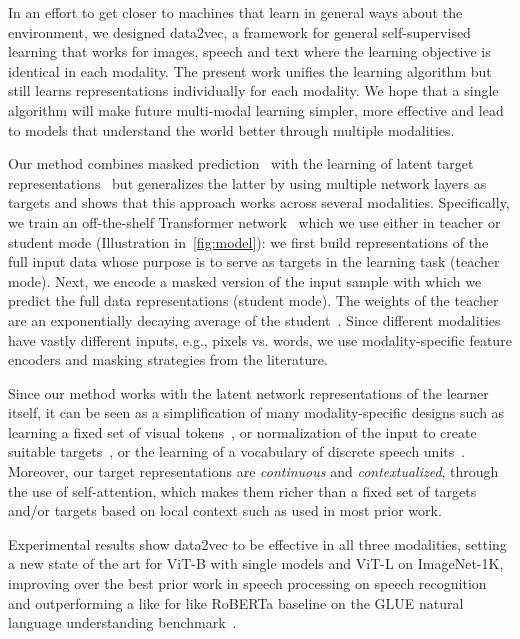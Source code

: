\documentclass[nohyperref]{article}
\theoremstyle{plain}
\theoremstyle{definition}
\theoremstyle{remark}
\newcommand{\name}{data2vec}
\begin{document}
In an effort to get closer to machines that learn in general ways about the environment, we designed \name{}, a framework for general self-supervised learning that works for images, speech and text where the learning objective is identical in each modality.
The present work unifies the learning algorithm but still learns representations individually for each modality.
We hope that a single algorithm will make future multi-modal learning simpler, more effective and lead to models that understand the world better through multiple modalities.

Our method combines masked prediction~\citep{devlin2018bert,baevski2020wav,bao2021beit} with the learning of latent target representations~\citep{grill2020byol,caron2021dino} but generalizes the latter by using multiple network layers as targets and shows that this approach works across several modalities.
Specifically, we train an off-the-shelf Transformer network~\citep{vaswani2017transformer} which we use either in teacher or student mode (Illustration in~\autoref{fig:model}):
we first build representations of the full input data whose purpose is to serve as targets in the learning task (teacher mode).
Next, we encode a masked version of the input sample with which we predict the full data representations (student mode).
The weights of the teacher are an exponentially decaying average of the student~\citep{he2019momentum,grill2020byol,caron2021dino}.
Since different modalities have vastly different inputs, e.g., pixels vs. words, we use modality-specific feature encoders and masking strategies from the literature.

Since our method works with the latent network representations of the learner itself, it can be seen as a simplification of many modality-specific designs such as learning a fixed set of visual tokens~\citep{radford2021clip,oord2017vqvae}, or normalization of the input to create suitable targets~\citep{he2021mae}, or the learning of a vocabulary of discrete speech units~\citep{baevski2020wav,hsu2020hubert}. 
Moreover, our target representations are \emph{continuous} and \emph{contextualized}, through the use of self-attention, which makes them richer than a fixed set of targets and/or targets based on local context such as used in most prior work.

Experimental results show \name{} to be effective in all three modalities, setting a new state of the art for ViT-B with single models and ViT-L on ImageNet-1K, improving over the best prior work in speech processing on speech recognition~\citep{baevski2020wav,hsu2020hubert} and outperforming a like for like RoBERTa baseline on the GLUE natural language understanding benchmark~\citep{liu2019roberta}.
\end{document}
